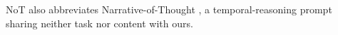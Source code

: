 NoT also abbreviates Narrative-of-Thought
\citep{zhang2024narrativeofthought}, a temporal-reasoning prompt sharing
neither task nor content with ours.

